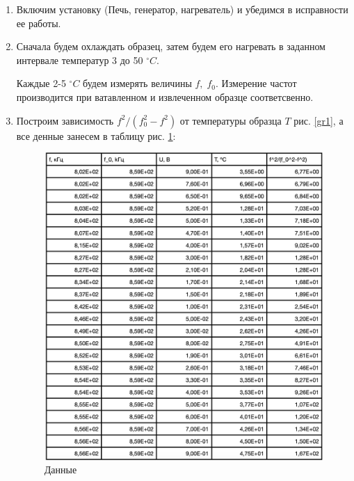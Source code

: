 \documentclass[a4paper]{article}
\begin{document}
\begin{enumerate}
    \item Включим установку (Печь, генератор, нагреватель) и убедимся в исправности ее работы.
    \item Сначала будем охлаждать образец, затем будем его нагревать в заданном интервале температур 3 до 50 $^{\circ} C$. \par 
    Каждые 2-5 $^{\circ}C$ будем измерять величины $f, \; f_0$. Измерение частот производится при ватавленном и извлеченном образце соответсвенно.
    \item Построим зависимость $f^2/(f_0^2 - f^2)$ от температуры образца $T$ рис. \ref{gr1}, а все денные занесем в таблицу рис. \ref{t1}:
    
    \begin{figure}[H]
        \begin{center}
            \includegraphics[scale = 0.7]{data.png}
            \caption{Данные}
            \label{t1}
        \end{center}
    \end{figure}


\end{enumerate}
\end{document}
